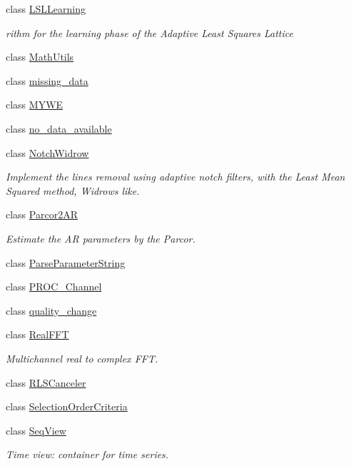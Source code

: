 \begin{DoxyCompactItemize}
class \hyperlink{classtsa_1_1_l_s_l_learning}{L\+S\+L\+Learning}
\begin{DoxyCompactList}\small\item\em rithm for the learning phase of the Adaptive Least Squares Lattice \end{DoxyCompactList}\item 
class \hyperlink{classtsa_1_1_math_utils}{Math\+Utils}
\item 
class \hyperlink{classtsa_1_1missing__data}{missing\+\_\+data}
\item 
class \hyperlink{classtsa_1_1_m_y_w_e}{M\+Y\+WE}
\item 
class \hyperlink{classtsa_1_1no__data__available}{no\+\_\+data\+\_\+available}
\item 
class \hyperlink{classtsa_1_1_notch_widrow}{Notch\+Widrow}
\begin{DoxyCompactList}\small\item\em Implement the lines removal using adaptive notch filters, with the Least Mean Squared method, Widrow\textquotesingle{}s like. \end{DoxyCompactList}\item 
class \hyperlink{classtsa_1_1_parcor2_a_r}{Parcor2\+AR}
\begin{DoxyCompactList}\small\item\em Estimate the AR parameters by the Parcor. \end{DoxyCompactList}\item 
class \hyperlink{classtsa_1_1_parse_parameter_string}{Parse\+Parameter\+String}
\item 
class \hyperlink{classtsa_1_1_p_r_o_c___channel}{P\+R\+O\+C\+\_\+\+Channel}
\item 
class \hyperlink{classtsa_1_1quality__change}{quality\+\_\+change}
\item 
class \hyperlink{classtsa_1_1_real_f_f_t}{Real\+F\+FT}
\begin{DoxyCompactList}\small\item\em Multichannel real to complex F\+FT. \end{DoxyCompactList}\item 
class \hyperlink{classtsa_1_1_r_l_s_canceler}{R\+L\+S\+Canceler}
\item 
class \hyperlink{classtsa_1_1_selection_order_criteria}{Selection\+Order\+Criteria}
\item 
class \hyperlink{classtsa_1_1_seq_view}{Seq\+View}
\begin{DoxyCompactList}\small\item\em Time view\+: container for time series. \end{DoxyCompactList}\item 

\end{DoxyCompactItemize}

